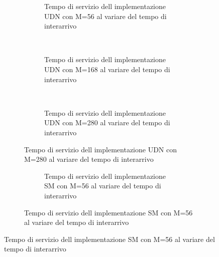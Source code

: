 \documentclass[a4paper]{article}
\begin{document}
\begin{figure}[!h]
  \caption{Grafici del tempo di servizio al variare del tempo di interarrivo}
  \begin{subfigure}[b]{.5\columnwidth}
    \centering
    \renewcommand\thesubfigure{\alph{subfigure}}
    \caption{Implementazione con solo UDN}
    \begin{subfigure}[b]{\textwidth}
      \centering
      \addtocounter{subfigure}{-1}
      \renewcommand\thesubfigure{\alph{subfigure}1}
      \resizebox{\columnwidth}{!}{}
      \caption{Tempo di servizio dell implementazione UDN con M=56 al variare del tempo di interarrivo}
      \label{fig:scalability_UDN_size56}
    \end{subfigure}
    ~
    \begin{subfigure}[b]{\textwidth}
      \centering
      \addtocounter{subfigure}{-1}
      \renewcommand\thesubfigure{\alph{subfigure}2}
      \resizebox{\columnwidth}{!}{}
      \caption{Tempo di servizio dell implementazione UDN con M=168 al variare del tempo di interarrivo}
      \label{fig:scalability_UDN_size168}
    \end{subfigure}
    ~
    \begin{subfigure}[b]{\textwidth}
      \centering
      \addtocounter{subfigure}{-1}
      \renewcommand\thesubfigure{\alph{subfigure}3}
      \resizebox{\columnwidth}{!}{}
      \caption{Tempo di servizio dell implementazione UDN con M=280 al variare del tempo di interarrivo}
      \label{fig:scalability_UDN_size280}
    \end{subfigure}
    \label{fig:allScalbility_UDN}
  \end{subfigure}
  \hspace{2ex}
  \begin{subfigure}[b]{.5\columnwidth}
    \centering
    \renewcommand\thesubfigure{\alph{subfigure}}
    \caption{Implementazione con solo SM}
    \begin{subfigure}[b]{\textwidth}
      \centering
      \addtocounter{subfigure}{-1}
      \renewcommand\thesubfigure{\alph{subfigure}1}
      \resizebox{\columnwidth}{!}{}
      \caption{Tempo di servizio dell implementazione SM con M=56 al variare del tempo di interarrivo}
      \label{fig:scalability_SM_size56}
    \end{subfigure}

\end{subfigure}
\end{figure}
\end{document}
